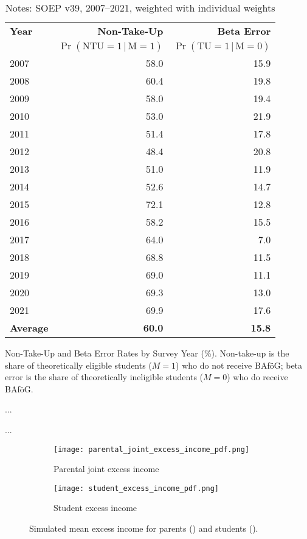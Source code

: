 \begin{table}[htbp]
\centering
\begin{tabular}{l@{\hspace{2em}}r@{\hspace{2em}}r}
\toprule
\textbf{Year} & \textbf{Non-Take-Up}  &  \textbf{Beta Error}  \\
              & \(\Pr(\text{NTU} =1\,|\,\text{M} = 1)\) & \(\Pr(\text{TU} = 1\,|\,\text{M} = 0)\) \\
\midrule
2007 & 58.0 & 15.9 \\
2008 & 60.4 & 19.8 \\
2009 & 58.0 & 19.4 \\
2010 & 53.0 & 21.9 \\
2011 & 51.4 & 17.8 \\
2012 & 48.4 & 20.8 \\
2013 & 51.0 & 11.9 \\
2014 & 52.6 & 14.7 \\
2015 & 72.1 & 12.8 \\
2016 & 58.2 & 15.5 \\
2017 & 64.0 & 7.0 \\
2018 & 68.8 & 11.5 \\
2019 & 69.0 & 11.1 \\
2020 & 69.3 & 13.0 \\
2021 & 69.9 & 17.6 \\
\midrule
\textbf{Average} & \textbf{60.0} & \textbf{15.8} \\
\bottomrule
\end{tabular}
\caption{Non-Take-Up and Beta Error Rates by Survey Year (\%). Non-take-up is the share of theoretically eligible students (\(M=1\)) who do not receive BAföG; beta error is the share of theoretically ineligible students (\(M=0\)) who do receive BAföG.}
\caption*{\small{Notes: SOEP v39, 2007--2021, weighted with individual weights}}
\label{table:microsimulation-ntu}
\end{table}

...



...

\begin{figure}[htbp]
  \centering
  \begin{subfigure}[t]{0.48\linewidth}
    \texttt{[image: parental\_joint\_excess\_income\_pdf.png]}
    \caption{Parental joint excess income}
    \label{fig:parental-excess}
  \end{subfigure}
  \hfill
  \begin{subfigure}[t]{0.48\linewidth}
    \texttt{[image: student\_excess\_income\_pdf.png]}
    \caption{Student excess income}
    \label{fig:student-excess}
  \end{subfigure}
  \caption{Simulated mean excess income for parents () and students ().}
  \label{fig:excess-income}
\end{figure}

